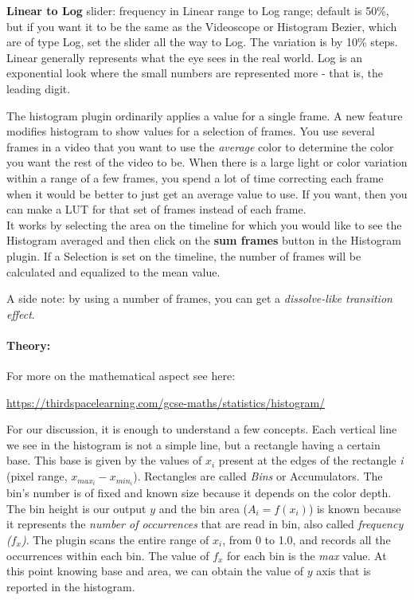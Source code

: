 \textbf{Linear to Log} slider: frequency in Linear range to Log range; default is 50\%, but if you want it to be the same as the Videoscope or Histogram Bezier, which are of type Log, set the slider all the way to Log.  The variation is by 10\% steps.  Linear generally represents what the eye sees in the real world.  Log is an exponential look where the small numbers are represented more - that is, the leading digit.

The histogram plugin ordinarily applies a value for a single frame.  A
new feature modifies histogram to show values for a selection of frames.
You use several frames in a video that you want to use the \textit{average}
color to determine the color you want the rest of the video to be.  When
there is a large light or color variation within a range of a few frames,
you spend a lot of time correcting each frame when it would be better to
just get an average value to use.  If you want, then you can make a LUT for
that set of frames instead of each frame.\\
It works by selecting the area on the timeline for
which you would like to see the Histogram averaged and then click on the
\textbf{sum frames} button in the Histogram plugin. If a Selection is set on the timeline, the number of frames will be calculated and equalized to the mean value.

A side note: by using a number of frames, you can get a \textit{dissolve-like
transition effect}.

\paragraph{Theory:} 

For more on the mathematical aspect see here:

{\small \url{https://thirdspacelearning.com/gcse-maths/statistics/histogram/}}

For our discussion, it is enough to understand a few concepts. Each vertical line we see in the histogram is not a simple line, but a rectangle having a certain base. This base is given by the values of $x_i$ present at the edges of the rectangle \textit{i} (pixel range, $x_{max_i} - x_{min_i}$). Rectangles are called \textit{Bins} or Accumulators. The bin's number is of fixed and known size because it depends on the color depth. The bin height is our output $y$ and the bin area ($A_i = f(x_i)$) is known because it represents the \textit{number of occurrences} that are read in bin, also called \textit{frequency ($f_x$)}. The plugin scans the entire range of $x_i$, from 0 to 1.0, and records all the occurrences within each bin. The value of $f_x$ for each bin is the \textit{max} value. At this point knowing base and area, we can obtain the value of $y$ axis that is reported in the histogram.

